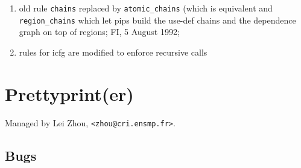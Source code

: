 \begin{enumerate}

  \item old rule \verb+chains+ replaced by \verb+atomic_chains+ (which
	is equivalent and \verb+region_chains+ which let pips build the
	use-def chains and the dependence graph on top of regions;
	FI, 5 August 1992;

  \item rules for icfg are modified to enforce recursive calls

\end{enumerate}

\section{Prettyprint(er)}

Managed by Lei Zhou, \verb+<zhou@cri.ensmp.fr>+.

\subsection{Bugs}

